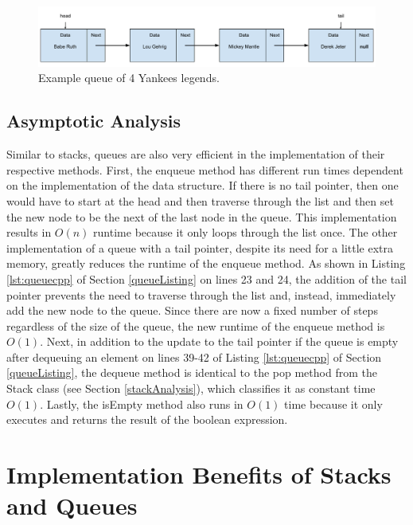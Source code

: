 \documentclass[letterpaper, 10pt,DIV=13]{scrartcl}
\numberwithin{equation}{section} %
\numberwithin{figure}{section} %
\numberwithin{table}{section} %
\begin{document}
\begin{figure}[ht] 
    \centering 
    \includegraphics[width=15cm]{queue}
    \caption{Example queue of 4 Yankees legends.}
    \label{figure:queue}
\end{figure}

\subsection{Asymptotic Analysis}\label{queueAnalysis}
Similar to stacks, queues are also very efficient in the implementation of their respective methods. First, the enqueue method has different run times dependent on the implementation of the data structure. If there is no tail pointer, then one would have to start at the head and then traverse through the list and then set the new node to be the next of the last node in the queue. This implementation results in $O(n)$ runtime because it only loops through the list once. The other implementation of a queue with a tail pointer, despite its need for a little extra memory, greatly reduces the runtime of the enqueue method. As shown in Listing \ref{lst:queuecpp} of Section \ref{queueListing} on lines 23 and 24, the addition of the tail pointer prevents the need to traverse through the list and, instead, immediately add the new node to the queue. Since there are now a fixed number of steps regardless of the size of the queue, the new runtime of the enqueue method is $O(1)$. Next, in addition to the update to the tail pointer if the queue is empty after dequeuing an element on lines 39-42 of Listing \ref{lst:queuecpp} of Section \ref{queueListing}, the dequeue method is identical to the pop method from the Stack class (see Section \ref{stackAnalysis}), which classifies it as constant time $O(1)$. Lastly, the isEmpty method also runs in $O(1)$ time because it only executes and returns the result of the boolean expression.

\section{Implementation Benefits of Stacks and Queues}
\end{document}
